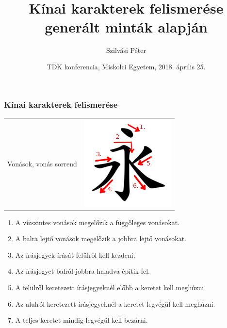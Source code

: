\documentclass{beamer}
\begin{document}

\title[Kínai karakterek felismerése
generált minták alapján]{
{\Large Kínai karakterek felismerése
generált minták alapján}
}
\author[Szilvási Péter]{\Large Szilvási Péter}
\date{TDK konferencia, Miskolci Egyetem, 2018. április 25.}

\frame{\titlepage}

\begin{frame}[fragile]
\frametitle{Kínai karakterek felismerése}

\begin{tabular}{c c}
{\large Vonások, vonás sorrend} & 
\includegraphics[scale=0.3, center]{vonasrend_ordered}
\end{tabular}

\begin{enumerate}
\item A vízszintes vonások megelőzik a függőleges vonásokat.
\item A balra lejtő vonások megelőzik a jobbra lejtő vonásokat.
\item Az írásjegyek írását felülről kell kezdeni.
\item Az írásjegyet balról jobbra haladva építik fel.
\item A felülről keretezett írásjegyeknél előbb a keretet kell meghúzni.
\item Az alulról keretezett írásjegyeknél a keretet legvégül kell meghúzni.
\item A teljes keretet mindig legvégül kell bezárni.
\end{enumerate}

\end{frame}
\end{document}

